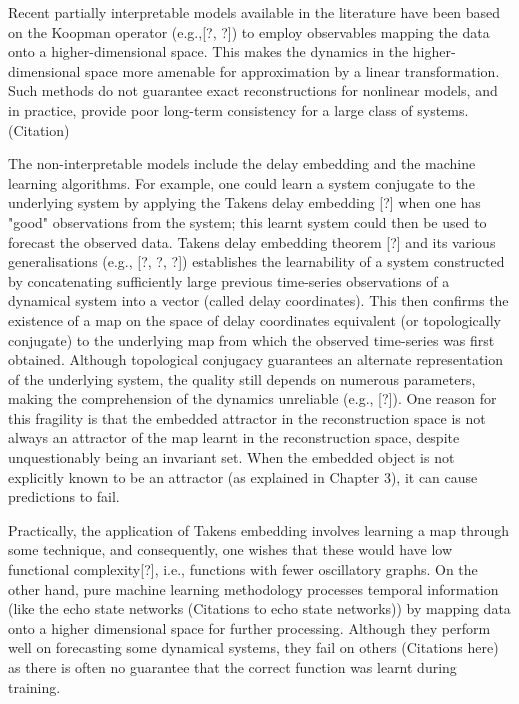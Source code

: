 \documentclass[a4paper,12pt,twoside]{report}
\begin{document}
Recent partially interpretable models available in the literature have been based on the Koopman operator (e.g.,[?, ?]) to employ observables mapping the data onto a higher-dimensional space. This makes the dynamics in the higher-dimensional space more amenable for approximation by a linear transformation. Such methods do not guarantee exact reconstructions for nonlinear models, and in practice, provide poor long-term consistency for a large class of systems. (Citation)

The non-interpretable models include the delay embedding and the machine learning algorithms. For example, one could learn a system conjugate to the underlying system by applying the Takens delay embedding [?] when one has "good" observations from the system; this learnt system could then be used to forecast the observed data. Takens delay embedding theorem [?] and its various generalisations (e.g., [?, ?, ?]) establishes the learnability of a system constructed by concatenating sufficiently large previous time-series observations of a dynamical system into a vector (called delay coordinates). This then confirms the existence of a map on the space of delay coordinates equivalent (or topologically conjugate) to the underlying map from which the observed time-series was first obtained. Although topological conjugacy guarantees an alternate representation of the underlying system, the quality still depends on numerous parameters, making the comprehension of the dynamics unreliable (e.g., [?]). One reason for this fragility is that the embedded attractor in the reconstruction space is not always an attractor of the map learnt in the reconstruction space, despite unquestionably being an invariant set. When the embedded object is not explicitly known to be an attractor (as explained in Chapter 3), it can cause predictions to fail.

Practically, the application of Takens embedding involves learning a map through some technique, and consequently, one wishes that these would have low functional complexity[?], i.e., functions with fewer oscillatory graphs. On the other hand, pure machine learning methodology processes temporal information (like the echo state networks (Citations to echo state networks)) by mapping data onto a higher dimensional space for further processing. Although they perform well on forecasting some dynamical systems, they fail on others (Citations here) as there is often no guarantee that the correct function was learnt during training.
\end{document}
